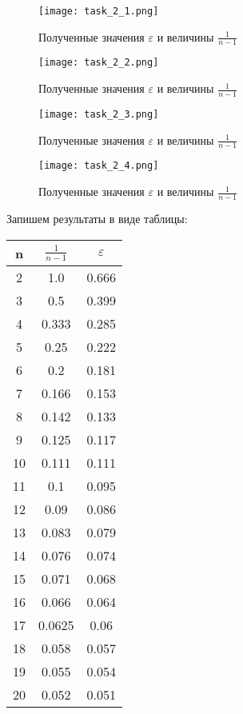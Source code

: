 \begin{figure}[h]
	\centering
	\texttt{[image: task\_2\_1.png]}
	\caption{Полученные значения $\varepsilon$ и величины $\frac{1}{n - 1}$}
\end{figure}

\newpage

\begin{figure}[h]
	\centering
	\texttt{[image: task\_2\_2.png]}
	\caption{Полученные значения $\varepsilon$ и величины $\frac{1}{n - 1}$}
\end{figure}

\newpage

\begin{figure}[h]
	\centering
	\texttt{[image: task\_2\_3.png]}
	\caption{Полученные значения $\varepsilon$ и величины $\frac{1}{n - 1}$}
\end{figure}

\newpage

\begin{figure}[h]
	\centering
	\texttt{[image: task\_2\_4.png]}
	\caption{Полученные значения $\varepsilon$ и величины $\frac{1}{n - 1}$}
\end{figure}

Запишем результаты в виде таблицы:

\begin{center}
	\begin{tabular}{ |c|c|c| } 
		\hline
		n & $\frac{1}{n - 1}$ & $\varepsilon$ \\ 
		\hline
		2 & 1.0 & 0.666 \\ 
		3 & 0.5 & 0.399 \\ 
		4 & 0.333 & 0.285 \\ 
		5 & 0.25 & 0.222 \\ 
		6 & 0.2 & 0.181 \\ 
		7 & 0.166 & 0.153 \\ 
		8 & 0.142 & 0.133 \\ 
		9 & 0.125 & 0.117 \\ 
		10 & 0.111 & 0.111 \\ 
		11 & 0.1 & 0.095 \\ 
		12 & 0.09 & 0.086 \\ 
		13 & 0.083 & 0.079 \\ 
		14 & 0.076 & 0.074 \\ 
		15 & 0.071 & 0.068 \\ 
		16 & 0.066 & 0.064 \\ 
		17 & 0.0625 & 0.06 \\ 
		18 & 0.058 & 0.057 \\ 
		19 & 0.055 & 0.054 \\ 
		20 & 0.052 & 0.051 \\ 
		\hline
	\end{tabular}
\end{center}

